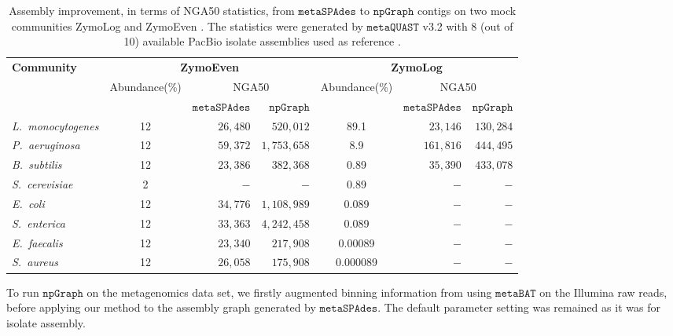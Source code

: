 \documentclass[10pt,twocolumn,twoside]{genpaper}
\newcommand{\npgraph}{$\mathtt{npGraph}$}
\begin{document}
\begin{table}[!hpt]
\begin{center}
\caption{Assembly improvement, in terms of NGA50 statistics, from $\mathtt{metaSPAdes}$ to \npgraph{} contigs on two mock communities ZymoLog and ZymoEven \cite{Nick2019zymo}. The statistics were generated by $\mathtt{metaQUAST}$ v3.2 with 8 (out of 10) available PacBio isolate assemblies used as reference \cite{Mcintyre2019zymo}.}
\label{table:zymo}
\begin{tabular}{|l|c|r|r|c|r|r|}
\hline
\multirow{3}{*}{\textbf{Community}} & \multicolumn{3}{|c|}{\textbf{ZymoEven}} & \multicolumn{3}{|c|}{\textbf{ZymoLog}} \\ \cline{2-7}
& \multirow{2}{*}{Abundance(\%)} & \multicolumn{2}{|c|}{NGA50} & \multirow{2}{*}{Abundance(\%)} & \multicolumn{2}{|c|}{NGA50} \\ \cline{3-4} \cline{6-7}
& & $\mathtt{metaSPAdes}$ & \npgraph{} &  & $\mathtt{metaSPAdes}$ & \npgraph{} \\
\hline
\emph{L.~monocytogenes} & 12 & $26,480$ & $520,012$ & 89.1 & $23,146$ & $130,284$ \\ \hline
\emph{P.~aeruginosa} & 12 & $59,372$ & $1,753,658$ & 8.9 & $161,816$ & $444,495$ \\ \hline
\emph{B.~subtilis} & 12 & $23,386$ & $382,368$ & 0.89 & $35,390$ & $433,078$ \\ \hline
\emph{S.~cerevisiae} & 2 & $-$ & $-$ & 0.89 & $-$ & $-$ \\ \hline
\emph{E.~coli} & 12 & $34,776$ & $1,108,989$ & 0.089 & $-$ & $-$ \\ \hline
\emph{S.~enterica} & 12 & $33,363$ & $4,242,458$ & 0.089 & $-$ & $-$ \\ \hline
\emph{E.~faecalis} & 12 & $23,340$ & $217,908$ & 0.00089 & $-$ & $-$ \\ \hline
\emph{S.~aureus} & 12 & $26,058$ & $175,908$ & 0.000089 & $-$ &$-$ \\ \hline
\end{tabular}
\end{center}
\end{table}

To run \npgraph{} on the metagenomics data set, we firstly augmented binning information from using $\mathtt{metaBAT}$ \cite{Kang2015metabat} on the Illumina raw reads, before applying our method to the assembly graph generated by $\mathtt{metaSPAdes}$. The default parameter setting was remained as it was for isolate assembly. 
\end{document}
